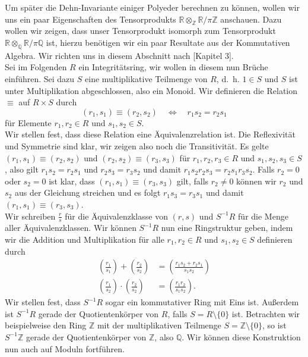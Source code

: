 \documentclass[11pt,titlepage]{article}
\newcommand{\setZ}{\mathbb{Z}}
\newcommand{\setQ}{\mathbb{Q}}
\newcommand{\setR}{\mathbb{R}}
\theoremstyle{definition}
\theoremstyle{remark}
\begin{document}
	Um später die Dehn-Invariante einiger Polyeder berechnen zu können, 
	wollen wir uns ein paar Eigenschaften des Tensorprodukts 
	$\setR\otimes_{\setZ}\setR /\pi\setZ$ anschauen. Dazu wollen wir zeigen, dass unser Tensorprodukt isomorph zum Tensorprodukt  
	$\setR\otimes_{\setQ}\setR /\pi\setQ$ ist, hierzu benötigen wir ein 
	paar Resultate 
	aus der Kommutativen Algebra. Wir richten uns in diesem Abschnitt 
	nach \cite{introductiontocomalg}[Kapitel 3].\\
	Sei im Folgenden $R$ ein Integritätsring, wir wollen in diesem nun 
	Brüche einführen. Sei dazu $S$ eine multiplikative Teilmenge von $R$, d.~h.
	$1\in S$ und $S$ ist unter Multiplikation abgeschlossen, also ein Monoid. Wir 
	definieren die Relation $\equiv$ auf $R\times S$ durch
	\[(r_1,s_1)\equiv(r_2,s_2)\quad \Leftrightarrow\quad r_1 s_2 =r_2 s_1\]
	für Elemente $r_1,r_2\in R$ und $s_1,s_2\in S$. \\
	Wir stellen fest, dass diese Relation  eine Äquivalenzrelation ist. Die 
	Reflexivität und Symmetrie sind klar, wir zeigen also noch die Transitivität.
	Es gelte $(r_1,s_1)\equiv(r_2,s_2)$ und $(r_2,s_2)\equiv(r_3,s_3)$ für 
	$r_1,r_2,r_3\in R$ und $s_1,s_2,s_3\in S$, also gilt $r_1 s_2= r_2 s_1$ und 
	$r_2 s_3 =r_3 s_2$ und damit $r_1 s_2 r_2 s_3 =r_2 s_1 r_3 s_2$. Falls $r_2=0$ 
	oder $s_2=0$ 
	ist klar, dass $(r_1,s_1)\equiv(r_3,s_3)$ gilt, falls $r_2\neq 0$ können wir $r_2$ und $s_2$ aus der Gleichung streichen und es folgt 
	$r_1 s_3=r_3 s_1$ und damit $(r_1,s_1)\equiv(r_3,s_3)$. \\
	Wir schreiben $\frac{r}{s}$ für die Äquivalenzklasse 
	von $(r,s)$ und $S^{-1}R$ 
	für die Menge aller Äquivalenzklassen. 
	Wir können $S^{-1}R$ nun eine Ringstruktur geben, indem wir die Addition und Multiplikation für 
	alle $r_1,r_2\in R$ und $s_1,s_2\in S$ definieren durch
	\begin{align*}
		\left(\frac{r_1}{s_1}\right)+\left(\frac{r_2}{s_2}\right)
		&=\left(\frac{r_1s_2+r_2s_1}{s_1s_2}\right) \\
		\left(\frac{r_1}{s_2}\right)\cdot\left(\frac{r_2}{s_2}\right)
		&=\left(\frac{r_1r_2}{s_1s_2}\right).
	\end{align*}
	Wir stellen fest, dass 
	$S^{-1}R$ sogar ein kommutativer Ring mit Eins ist. Außerdem ist 
	$S^{-1}R$ gerade der Quotientenkörper von $R$, falls $S=R\setminus\{0\}$ ist. Betrachten wir beispielweise den Ring 
	$\setZ$ mit der multiplikativen Teilmenge $S=\setZ\setminus\{0\}$, so 
	ist $S^{-1}\setZ$ gerade der Quotientenkörper von $\setZ$, also 
	$\setQ$. Wir können diese Konstruktion nun auch auf Moduln fortführen. 
\end{document}
